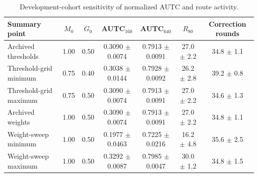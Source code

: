 \begin{table}[H]
\centering
\caption{Development-cohort sensitivity of normalized AUTC and route activity.}
\label{tab:parameter-sensitivity}
\small
\begin{tabular}{lcccccc}
\toprule
Summary point & $M_0$ & $G_0$ & AUTC$_{160}$ & AUTC$_{640}$ & $R_{80}$ & Correction rounds \\
\midrule
Archived thresholds & 1.00 & 0.50 & 0.3090 $\pm$ 0.0074 & 0.7913 $\pm$ 0.0091 & 27.0 $\pm$ 2.2 & 34.8 $\pm$ 1.1 \\
Threshold-grid minimum & 0.75 & 0.40 & 0.3038 $\pm$ 0.0144 & 0.7928 $\pm$ 0.0092 & 26.2 $\pm$ 2.8 & 39.2 $\pm$ 0.8 \\
Threshold-grid maximum & 0.75 & 0.50 & 0.3090 $\pm$ 0.0074 & 0.7913 $\pm$ 0.0091 & 27.0 $\pm$ 2.2 & 34.6 $\pm$ 1.3 \\
Archived weights & 1.00 & 0.50 & 0.3090 $\pm$ 0.0074 & 0.7913 $\pm$ 0.0091 & 27.0 $\pm$ 2.2 & 34.8 $\pm$ 1.1 \\
Weight-sweep minimum & 1.00 & 0.50 & 0.1977 $\pm$ 0.0463 & 0.7225 $\pm$ 0.0216 & 16.2 $\pm$ 4.8 & 35.6 $\pm$ 2.5 \\
Weight-sweep maximum & 1.00 & 0.50 & 0.3292 $\pm$ 0.0087 & 0.7985 $\pm$ 0.0047 & 30.0 $\pm$ 1.2 & 34.8 $\pm$ 1.5 \\
\bottomrule
\end{tabular}
\end{table}

